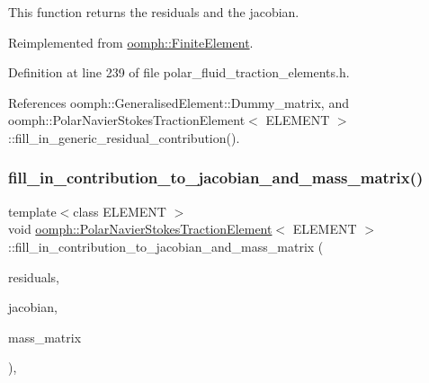This function returns the residuals and the jacobian. 



Reimplemented from \hyperlink{classoomph_1_1FiniteElement_a0ae7af222af38a0d53bf283dc85bdfea}{oomph\+::\+Finite\+Element}.



Definition at line 239 of file polar\+\_\+fluid\+\_\+traction\+\_\+elements.\+h.



References oomph\+::\+Generalised\+Element\+::\+Dummy\+\_\+matrix, and oomph\+::\+Polar\+Navier\+Stokes\+Traction\+Element$<$ E\+L\+E\+M\+E\+N\+T $>$\+::fill\+\_\+in\+\_\+generic\+\_\+residual\+\_\+contribution().

\mbox{\label{classoomph_1_1PolarNavierStokesTractionElement_ab3d5f0fb4c4a3c9330ce0b3d99efd321}} 
\subsubsection{\texorpdfstring{fill\+\_\+in\+\_\+contribution\+\_\+to\+\_\+jacobian\+\_\+and\+\_\+mass\+\_\+matrix()}{fill\_in\_contribution\_to\_jacobian\_and\_mass\_matrix()}}
{\footnotesize\ttfamily template$<$class E\+L\+E\+M\+E\+NT $>$ \\
void \hyperlink{classoomph_1_1PolarNavierStokesTractionElement}{oomph\+::\+Polar\+Navier\+Stokes\+Traction\+Element}$<$ E\+L\+E\+M\+E\+NT $>$\+::fill\+\_\+in\+\_\+contribution\+\_\+to\+\_\+jacobian\+\_\+and\+\_\+mass\+\_\+matrix (\begin{DoxyParamCaption}\item[{\hyperlink{classoomph_1_1Vector}{Vector}$<$ double $>$ \&}]{residuals,  }\item[{\hyperlink{classoomph_1_1DenseMatrix}{Dense\+Matrix}$<$ double $>$ \&}]{jacobian,  }\item[{\hyperlink{classoomph_1_1DenseMatrix}{Dense\+Matrix}$<$ double $>$ \&}]{mass\+\_\+matrix }\end{DoxyParamCaption})\hspace{0.3cm}{\ttfamily [inline]}, {\ttfamily [virtual]}}



